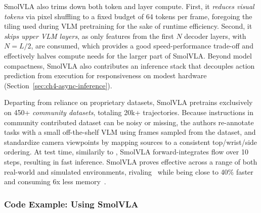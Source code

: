 SmolVLA also trims down both token and layer compute.
First, it \emph{reduces visual tokens} via pixel shuffling to a fixed budget of 64 tokens per frame, foregoing the tiling used during VLM pretraining for the sake of runtime efficiency. 
Second, it \emph{skips upper VLM layers}, as only features from the first \(N\) decoder layers, with \(N=L/2\), are consumed, which provides a good speed-performance trade-off and effectively halves compute needs for the larger part of SmolVLA.
Beyond model compactness, SmolVLA also contributes an inference stack that decouples action prediction from execution for responsiveness on modest hardware (Section~\ref{sec:ch4-async-inference}).

Departing from reliance on proprietary datasets, SmolVLA pretrains exclusively on 450+ \emph{community datasets}, totaling 20k+ trajectories. 
Because instructions in community contributed dataset can be noisy or missing, the authors re-annotate tasks with a small off-the-shelf VLM using frames sampled from the dataset, and standardize camera viewpoints by mapping sources to a consistent top/wrist/side ordering.
At test time, similarily to \pizero, SmolVLA forward-integrates flow over 10 steps, resulting in fast inference.
SmolVLA proves effective across a range of both real-world and simulated environments, rivaling \pizero~while being close to 40\% faster and consuming 6x less memory~\citep{shukorSmolVLAVisionLanguageActionModel2025}.

\subsubsection{Code Example: Using SmolVLA}
